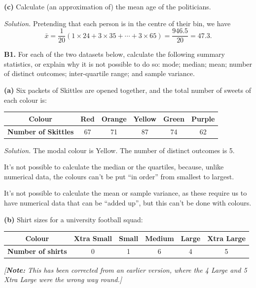 \documentclass[
  a4paper,
]{book}
\theoremstyle{definition}
\theoremstyle{definition}
\theoremstyle{definition}
\theoremstyle{definition}
\theoremstyle{remark}
\begin{document}
\textbf{(c)} Calculate (an approximation of) the mean age of the politicians.

\begin{myanswers}
\emph{Solution.}
Pretending that each person is in the centre of their bin, we have
\[ \bar x = \frac{1}{20} (1\times24 + 3\times 35 + \cdots + 3 \times 65) = \frac{946.5}{20} = 47.3 . \]

\end{myanswers}

\textbf{B1.} For each of the two datasets below, calculate the following summary statistics, or explain why it is not possible to do so: mode; median; mean; number of distinct outcomes; inter-quartile range; and sample variance.

\textbf{(a)} Six packets of Skittles are opened together, and the total number of sweets of each colour is:

\begin{longtable}[]{@{}cccccc@{}}
\toprule
\textbf{Colour} & Red & Orange & Yellow & Green & Purple \\
\midrule
\endhead
\textbf{Number of Skittles} & 67 & 71 & 87 & 74 & 62 \\
\bottomrule
\end{longtable}

\begin{myanswers}
\emph{Solution.}
The modal colour is Yellow. The number of distinct outcomes is 5.

It's not possible to calculate the median or the quartiles, because, unlike numerical data, the colours can't be put ``in order'' from smallest to largest.

It's not possible to calculate the mean or sample variance, as these require us to have numerical data that can be ``added up'', but this can't be done with colours.

\end{myanswers}

\textbf{(b)} Shirt sizes for a university football squad:

\begin{longtable}[]{@{}cccccc@{}}
\toprule
\textbf{Colour} & Xtra Small & Small & Medium & Large & Xtra Large \\
\midrule
\endhead
\textbf{Number of shirts} & 0 & 1 & 6 & 4 & 5 \\
\bottomrule
\end{longtable}

\emph{{[}\textbf{Note:} This has been corrected from an earlier version, where the 4 Large and 5 Xtra Large were the wrong way round.{]}}
\end{document}
